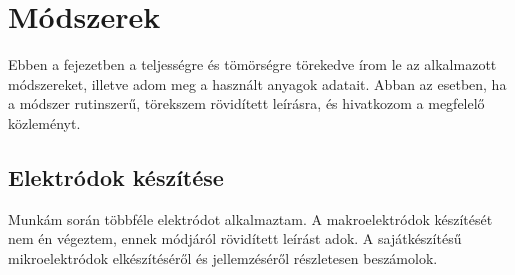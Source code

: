 \chapter{Módszerek}
\pagestyle{headings}

Ebben a fejezetben a teljességre és tömörségre törekedve írom le az alkalmazott módszereket, illetve adom meg a használt anyagok adatait. Abban az esetben, ha a módszer rutinszerű, törekszem rövidített leírásra, és hivatkozom a megfelelő közleményt.

\section{Elektródok készítése}

Munkám során többféle elektródot alkalmaztam. A makroelektródok készítését nem én végeztem, ennek módjáról rövidített leírást adok. A sajátkészítésű mikroelektródok elkészítéséről és jellemzéséről részletesen beszámolok.

